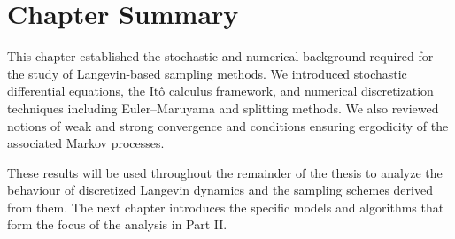 \documentclass[11pt, twoside]{report}
\begin{document}
\section{Chapter Summary}

This chapter established the stochastic and numerical background required for the study of Langevin-based sampling methods. We
introduced stochastic differential equations, the It\^{o} calculus framework, and numerical discretization techniques including
Euler--Maruyama and splitting methods. We also reviewed notions of weak and strong convergence and conditions ensuring ergodicity of
the associated Markov processes.

These results will be used throughout the remainder of the thesis to analyze the behaviour of discretized Langevin dynamics and the
sampling schemes derived from them. The next chapter introduces the specific models and algorithms that form the focus of the analysis
in Part II.
\end{document}

